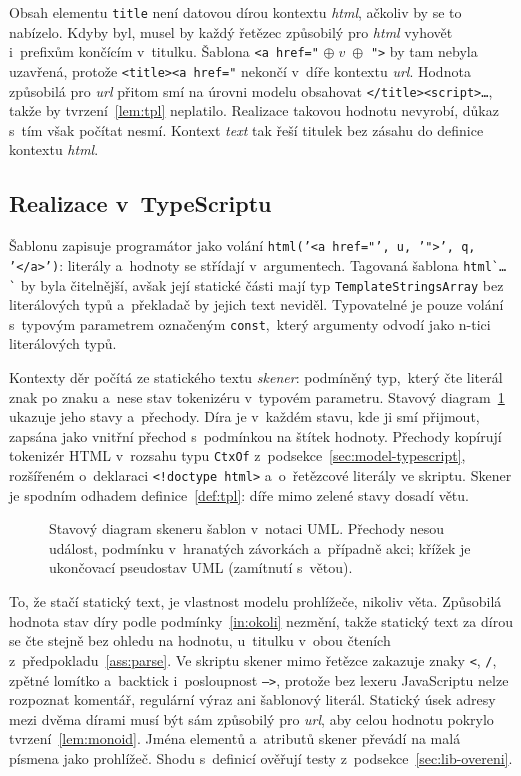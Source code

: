 Obsah elementu \texttt{title} není datovou dírou kontextu \emph{html}, ačkoliv by se to nabízelo. Kdyby byl, musel by každý řetězec způsobilý pro \emph{html} vyhovět i~prefixům končícím v~titulku. Šablona \verb|<a href="| $\oplus\; v \;\oplus$ \verb|">| by tam nebyla uzavřená, protože \verb|<title><a href="| nekončí v~díře kontextu \emph{url}. Hodnota způsobilá pro \emph{url} přitom smí na úrovni modelu obsahovat \verb|</title><script>…|, takže by tvrzení~\ref{lem:tpl} neplatilo. Realizace takovou hodnotu nevyrobí, důkaz s~tím však počítat nesmí. Kontext \emph{text} tak řeší titulek bez zásahu do definice kontextu \emph{html}.

\subsection{Realizace v~TypeScriptu}
\label{sec:lib-typescript}

Šablonu zapisuje programátor jako volání \texttt{html('<a href="', u, '">', q, '</a>')}: literály a~hodnoty se střídají v~argumentech. Tagovaná šablona \verb|html`…`| by byla čitelnější, avšak její statické části mají typ \texttt{TemplateStringsArray} bez literálových typů a~překladač by jejich text neviděl. Typovatelné je pouze volání s~typovým parametrem označeným \texttt{const},~který argumenty odvodí jako n-tici literálových typů.

Kontexty děr počítá ze statického textu \emph{skener}: podmíněný typ,~který čte literál znak po znaku a~nese stav tokenizéru v~typovém parametru. Stavový diagram~\ref{fig:skener} ukazuje jeho stavy a~přechody. Díra je v~každém stavu, kde ji smí přijmout, zapsána jako vnitřní přechod s~podmínkou na štítek hodnoty. Přechody kopírují tokenizér HTML v~rozsahu typu \texttt{CtxOf} z~podsekce~\ref{sec:model-typescript}, rozšířeném o~deklaraci \texttt{<!doctype html>} a~o~řetězcové literály ve skriptu. Skener je spodním odhadem definice~\ref{def:tpl}: díře mimo zelené stavy dosadí větu.

\begin{figure}[htbp]
    \centering
    \caption[Stavový diagram skeneru šablon]{Stavový diagram skeneru šablon v~notaci UML. Přechody nesou událost, podmínku v~hranatých závorkách a~případně akci; křížek je ukončovací pseudostav UML (zamítnutí s~větou).}
    \label{fig:skener}
\end{figure}

To, že stačí statický text, je vlastnost modelu prohlížeče, nikoliv věta. Způsobilá hodnota stav díry podle podmínky~\eqref{in:okoli} nezmění, takže statický text za dírou se čte stejně bez ohledu na hodnotu, u~titulku v~obou čteních z~předpokladu~\ref{ass:parse}. Ve skriptu skener mimo řetězce zakazuje znaky \texttt{<}, \texttt{/}, zpětné lomítko a~backtick i~posloupnost \texttt{-->}, protože bez lexeru JavaScriptu nelze rozpoznat komentář, regulární výraz ani šablonový literál. Statický úsek adresy mezi dvěma dírami musí být sám způsobilý pro \emph{url}, aby celou hodnotu pokrylo tvrzení~\ref{lem:monoid}. Jména elementů a~atributů skener převádí na malá písmena jako prohlížeč. Shodu s~definicí ověřují testy z~podsekce~\ref{sec:lib-overeni}.

